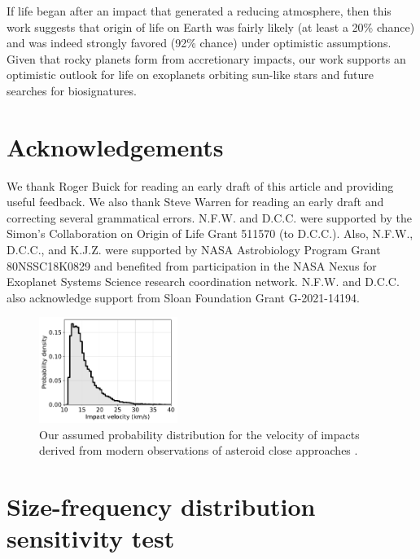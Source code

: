\documentclass{aastex631}
\begin{document}
If life began after an impact that generated a reducing atmosphere, then this work suggests that origin of life on Earth was fairly likely (at least a 20\% chance) and was indeed strongly favored (92\% chance) under optimistic assumptions. Given that rocky planets form from accretionary impacts, our work supports an optimistic outlook for life on exoplanets orbiting sun-like stars and future searches for biosignatures. 

\section*{Acknowledgements}

We thank Roger Buick for reading an early draft of this article and providing useful feedback. We also thank Steve Warren for reading an early draft and correcting several grammatical errors. N.F.W. and D.C.C. were supported by the Simon's Collaboration on Origin of Life Grant 511570 (to D.C.C.). Also, N.F.W., D.C.C., and K.J.Z. were supported by NASA Astrobiology Program Grant 80NSSC18K0829 and benefited from participation in the NASA Nexus for Exoplanet Systems Science research coordination network. N.F.W. and D.C.C. also acknowledge support from Sloan Foundation Grant G-2021-14194.

\appendix

\renewcommand{\thefigure}{A\arabic{figure}}
\renewcommand{\thetable}{A\arabic{table}}
\setcounter{figure}{0}
\setcounter{table}{0}

\begin{figure}
  \centering
  \includegraphics[width=0.4\textwidth]{figures/velocity_distribution.pdf}
  \caption{Our assumed probability distribution for the velocity of impacts derived from modern observations of asteroid close approaches \citep{Park_2023}.}
  \label{fig:velocity_distribution}
\end{figure}

\section{Size-frequency distribution sensitivity test} \label{sec:append_sfd}
\end{document}
